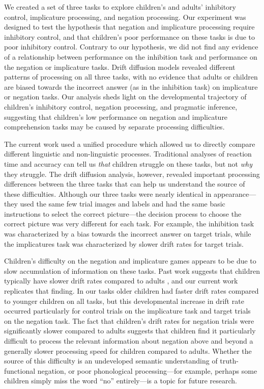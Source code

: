 \documentclass[man, noapacite]{apa2}
\begin{document}
We created a set of three tasks to explore children's and adults' inhibitory control, implicature processing, and negation processing. Our experiment was designed to test the hypothesis that negation and implicature processing require inhibitory control, and that children's poor performance on these tasks is due to poor inhibitory control. Contrary to our hypothesis, we did not find any evidence of a relationship between performance on the inhibition task and performance on the negation or implicature tasks. Drift diffusion models revealed different patterns of processing on all three tasks, with no evidence that adults or children are biased towards the incorrect answer (as in the inhibition task) on implicature or negation tasks. Our analysis sheds light on the developmental trajectory of children's inhibitory control, negation processing, and pragmatic inference, suggesting that children's low performance on negation and implicature comprehension tasks may be caused by separate processing difficulties.

The current work used a unified procedure which allowed us to directly compare different linguistic and non-linguistic processes. Traditional analyses of reaction time and accuracy can tell us \emph{that} children struggle on these tasks, but not \emph{why} they struggle. The drift diffusion analysis, however, revealed important processing differences between the three tasks that can help us understand the source of these difficulties. Although our three tasks were nearly identical in appearance---they used the same few trial images and labels and had the same basic instructions to select the correct picture---the decision process to choose the correct picture was very different for each task. For example, the inhibition task was characterized by a bias towards the incorrect answer on target trials, while the implicatures task was characterized by slower drift rates for target trials.

Children's difficulty on the negation and implicature games appears to be due to slow accumulation of information on these tasks. Past work suggests that children typically have slower drift rates compared to adults \cite{ratcliff2012}, and our current work replicates that finding. In our tasks older children had faster drift rates compared to younger children on all tasks, but this developmental increase in drift rate occurred particularly for control trials on the implicature task and target trials on the negation task. The fact that children's drift rates for negation trials were significantly slower compared to adults suggests that children find it particularly difficult to process the relevant information about negation above and beyond a generally slower processing speed for children compared to adults. Whether the source of this difficulty is an undeveloped semantic understanding of truth-functional negation, or poor phonological processing---for example, perhaps some children simply miss the word ``no'' entirely---is a topic for future research.
\end{document}
